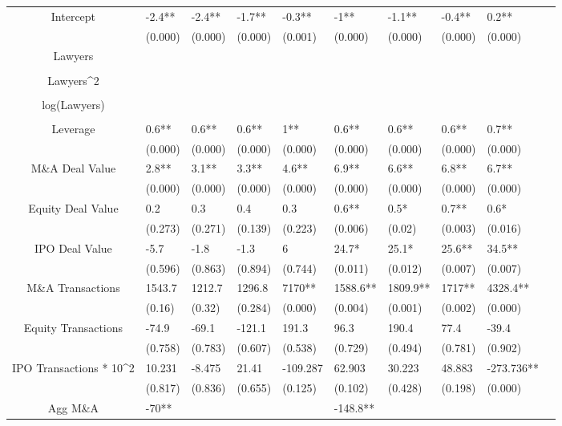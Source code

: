 \documentclass{article}
\begin{document}
\begin{table}[H]
\begin{tabular}{|clllllllll|}
Intercept & -2.4** & -2.4** & -1.7** & -0.3** & -1** & -1.1** & -0.4** & 0.2** & \\
   & (0.000) & (0.000) & (0.000) & (0.001) & (0.000) & (0.000) & (0.000) & (0.000) & \\
  Lawyers &  &  &  &  &  &  &  &  & \\
   &  &  &  &  &  &  &  &  & \\
  Lawyers^2 &  &  &  &  &  &  &  &  & \\
   &  &  &  &  &  &  &  &  & \\
  log(Lawyers) &  &  &  &  &  &  &  &  & \\
   &  &  &  &  &  &  &  &  & \\
  Leverage & 0.6** & 0.6** & 0.6** & 1** & 0.6** & 0.6** & 0.6** & 0.7** & \\
   & (0.000) & (0.000) & (0.000) & (0.000) & (0.000) & (0.000) & (0.000) & (0.000) & \\
  M\&A Deal Value & 2.8** & 3.1** & 3.3** & 4.6** & 6.9** & 6.6** & 6.8** & 6.7** & \\
   & (0.000) & (0.000) & (0.000) & (0.000) & (0.000) & (0.000) & (0.000) & (0.000) & \\
  Equity Deal Value & 0.2 & 0.3 & 0.4 & 0.3 & 0.6** & 0.5* & 0.7** & 0.6* & \\
   & (0.273) & (0.271) & (0.139) & (0.223) & (0.006) & (0.02) & (0.003) & (0.016) & \\
  IPO Deal Value & -5.7 & -1.8 & -1.3 & 6 & 24.7* & 25.1* & 25.6** & 34.5** & \\
   & (0.596) & (0.863) & (0.894) & (0.744) & (0.011) & (0.012) & (0.007) & (0.007) & \\
  M\&A Transactions & 1543.7 & 1212.7 & 1296.8 & 7170** & 1588.6** & 1809.9** & 1717** & 4328.4** & \\
   & (0.16) & (0.32) & (0.284) & (0.000) & (0.004) & (0.001) & (0.002) & (0.000) & \\
  Equity Transactions & -74.9 & -69.1 & -121.1 & 191.3 & 96.3 & 190.4 & 77.4 & -39.4 & \\
   & (0.758) & (0.783) & (0.607) & (0.538) & (0.729) & (0.494) & (0.781) & (0.902) & \\
  IPO Transactions * 10^2 & 10.231 & -8.475 & 21.41 & -109.287 & 62.903 & 30.223 & 48.883 & -273.736** & \\
   & (0.817) & (0.836) & (0.655) & (0.125) & (0.102) & (0.428) & (0.198) & (0.000) & \\
  Agg M\&A & -70** &  &  &  & -148.8** &  &  &  & \\

\end{tabular}
\end{table}
\end{document}
